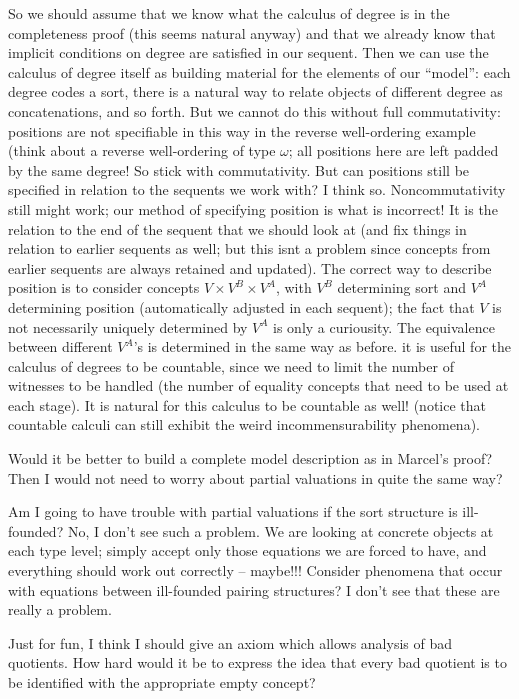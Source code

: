 \documentclass{article}
\begin{document}
So we should assume that we know what the calculus of degree is in the
completeness proof (this seems natural anyway) and that we already
know that implicit conditions on degree are satisfied in our sequent.
Then we can use the calculus of degree itself as building material for
the elements of our ``model'': each degree codes a sort, there is a
natural way to relate objects of different degree as concatenations,
and so forth.  But we cannot do this without full commutativity:
positions are not specifiable in this way in the reverse well-ordering
example (think about a reverse well-ordering of type $\omega$; all
positions here are left padded by the same degree!  So stick with
commutativity.  But can positions still be specified in relation to
the sequents we work with?  I think so.  Noncommutativity still might
work; our method of specifying position is what is incorrect!  It is
the relation to the end of the sequent that we should look at (and fix
things in relation to earlier sequents as well; but this isnt a
problem since concepts from earlier sequents are always retained and
updated).  The correct way to describe position is to consider
concepts $V \times V^B \times V^A$, with $V^B$ determining sort and
$V^A$ determining position (automatically adjusted in each sequent);
the fact that $V$ is not necessarily uniquely determined by $V^A$ is
only a curiousity.  The equivalence between different $V^A$'s is
determined in the same way as before.  it is useful for the calculus
of degrees to be countable, since we need to limit the number of
witnesses to be handled (the number of equality concepts that need to
be used at each stage).  It is natural for this calculus to be
countable as well!  (notice that countable calculi can still exhibit
the weird incommensurability phenomena).

Would it be better to build a complete model description as in
Marcel's proof?  Then I would not need to worry about partial
valuations in quite the same way?

Am I going to have trouble with partial valuations if the sort structure
is ill-founded?  No, I don't see such a problem.  We are looking at
concrete objects at each type level; simply accept only those equations
we are forced to have, and everything should work out correctly -- maybe!!!
Consider phenomena that occur with equations between ill-founded pairing
structures?  I don't see that these are really a problem.

Just for fun, I think I should give an axiom which allows analysis of bad
quotients.  How hard would it be to express the idea that every bad quotient
is to be identified with the appropriate empty concept?
\end{document}
